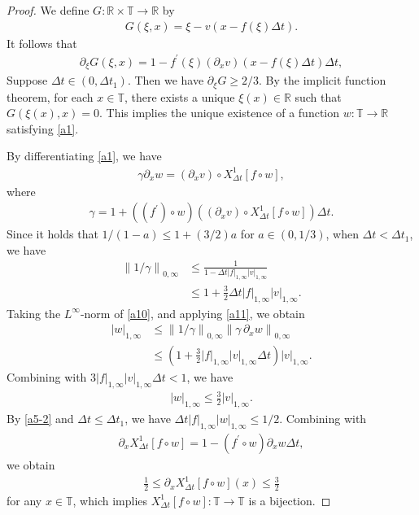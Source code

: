 \documentclass[10pt,a4paper,tbtags,leqno]{amsart}
\theoremstyle{definition}
\numberwithin{equation}{section}
\def\norm#1#2{\left\|#2\right\|_{#1}}
\def\snorm#1#2{\left|#2\right|_{#1}}
\begin{document}
\begin{proof} 
  We define $ G: \mathbb{R} \times \mathbb{T} \to \mathbb{R} $ by 
  \begin{align}
    G (\xi, x) = \xi - v (x - f (\xi) \Delta t). 
  \end{align}
  It follows that 
  \begin{align}
    \partial_\xi G (\xi, x) = 1 - f^\prime (\xi) (\partial_x v) (x - f (\xi) \Delta t) \Delta t, 
  \end{align} 
  Suppose $ \Delta t \in (0, \Delta t_1) $. Then we have $ \partial_\xi G \geq 2 / 3 $. 
  By the implicit function theorem, for each $ x \in \mathbb{T} $, there exists a unique $ \xi(x) \in \mathbb{R} $ such that $ G (\xi(x), x) = 0 $. 
  This implies the unique existence of a function $ w: \mathbb{T} \to \mathbb{R} $ satisfying \eqref{a1}. 

  By differentiating \eqref{a1}, we have 
  \begin{align}
    \gamma \partial_x w = (\partial_x v) \circ {X_{\Delta t}^1} [f \circ w], \label{a10} 
  \end{align}
  where 
  \begin{align}
     \gamma = 1 + \left((f^\prime) \circ w\right) \left((\partial_x v) \circ {X_{\Delta t}^1} [f \circ w]\right) \Delta t. \label{a35} 
  \end{align}
  Since it holds that $ 1 / (1 - a) \leq 1 + (3/2)a $ for $ a \in (0, 1/3) $, when $ \Delta t < \Delta t_1 $, we have 
  \begin{align} 
    \norm{0, \infty}{1 / \gamma} & \leq \frac{1}{1 - \Delta t \snorm{1, \infty}{f} \snorm{1, \infty}{v}} \\
    & \leq 1 + \frac{3}{2} \Delta t \snorm{1, \infty}{f} \snorm{1, \infty}{v}. \label{a11}
  \end{align} 
  Taking the $ L^\infty $-norm of \eqref{a10}, and applying \eqref{a11}, we obtain 
  \begin{align} 
    \snorm{1, \infty}{w} 
    & \leq \norm{0, \infty}{1 / \gamma} \norm{0,\infty}{\gamma \, \partial_x w} \\
    & \leq \left(1 + \frac{3}{2} \snorm{1, \infty}{f} \snorm{1, \infty}{v} \Delta t\right) \snorm{1,\infty}{v}. \label{a5} 
  \end{align} 
  Combining with $ 3 \snorm{1,\infty}{f} \snorm{1,\infty}{v} \Delta t < 1 $, we have 
  \begin{align} 
    \snorm{1, \infty}{w} \leq \frac{3}{2} \snorm{1, \infty}{v}. \label{a5-2}
  \end{align}
  By \eqref{a5-2} and $ \Delta t \leq \Delta t_1 $, we have $ \Delta t \snorm{1, \infty}{f} \snorm{1, \infty}{w} \leq 1/2 $. Combining with 
  \begin{align} 
    \partial_x {X_{\Delta t}^1} [f \circ w] = 1 - (f^\prime \circ w) \partial_x w \Delta t, 
  \end{align} 
  we obtain 
  \begin{align} 
    \frac{1}{2} \leq \partial_x {X_{\Delta t}^1} [f \circ w] (x) \leq \frac{3}{2} 
  \end{align} 
  for any $ x \in \mathbb{T} $, which implies $ {X_{\Delta t}^1} [f \circ w]: \mathbb{T} \to \mathbb{T} $ is a bijection. 
\end{proof} 
\end{document}
